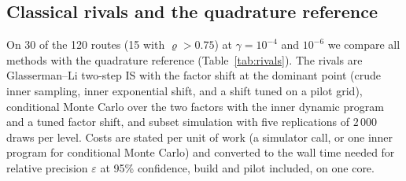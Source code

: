 \documentclass[11pt]{article}
\theoremstyle{definition}
\theoremstyle{remark}
\begin{document}
\subsection{Classical rivals and the quadrature reference}
\label{sec:baselines}
On 30 of the 120 routes (15 with $\varrho>0.75$) at $\gamma=10^{-4}$ and
$10^{-6}$ we compare all methods with the quadrature reference
(Table~\ref{tab:rivals}). The rivals are Glasserman--Li two-step IS
\citep{GlassermanLi2005} with the factor shift at the dominant point (crude
inner sampling, inner exponential shift, and a shift tuned on a pilot grid),
conditional Monte Carlo over the two factors with the inner dynamic program and
a tuned factor shift, and subset simulation \citep{AuBeck2001} with five
replications of $2\,000$ draws per level. Costs are stated per unit of work
(a simulator call, or one inner program for conditional Monte Carlo) and
converted to the wall time needed for relative precision $\varepsilon$ at 95\%
confidence, build and pilot included, on one core.
\end{document}
